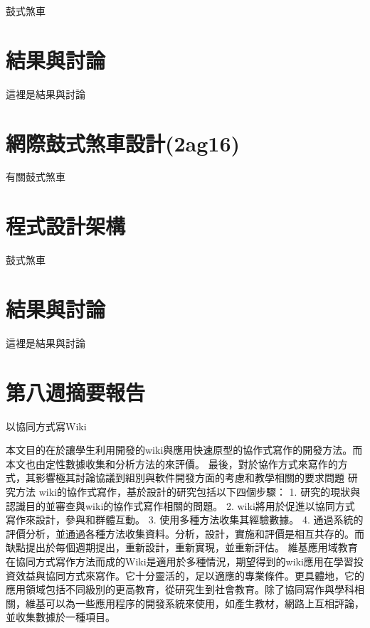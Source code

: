 \documentclass[]{article}
\begin{document}
鼓式煞車

\section{結果與討論}\label{ux7d50ux679cux8207ux8a0eux8ad6-3}

這裡是結果與討論

\section{網際鼓式煞車設計(2ag16)}\label{ux7db2ux969bux9f13ux5f0fux715eux8ecaux8a2dux8a082ag16}

有關鼓式煞車

\section{程式設計架構}\label{ux7a0bux5f0fux8a2dux8a08ux67b6ux69cb-4}

鼓式煞車

\section{結果與討論}\label{ux7d50ux679cux8207ux8a0eux8ad6-4}

這裡是結果與討論

\section{第八週摘要報告}\label{ux7b2cux516bux9031ux6458ux8981ux5831ux544a}

以協同方式寫Wiki

本文目的在於讓學生利用開發的wiki與應用快速原型的協作式寫作的開發方法。而本文也由定性數據收集和分析方法的來評價。
最後，對於協作方式來寫作的方式，其影響極其討論協議到組別與軟件開發方面的考慮和教學相關的要求問題
研究方法 wiki的協作式寫作，基於設計的研究包括以下四個步驟： 1.
研究的現狀與認識目的並審查與wiki的協作式寫作相關的問題。 2.
wiki將用於促進以協同方式寫作來設計，參與和群體互動。 3.
使用多種方法收集其經驗數據。 4.
通過系統的評價分析，並通過各種方法收集資料。分析，設計，實施和評價是相互共存的。而缺點提出於每個週期提出，重新設計，重新實現，並重新評估。
維基應用域教育在協同方式寫作方法而成的Wiki是適用於多種情況，期望得到的wiki應用在學習投資效益與協同方式來寫作。它十分靈活的，足以適應的專業條件。更具體地，它的應用領域包括不同級別的更高教育，從研究生到社會教育。除了協同寫作與學科相關，維基可以為一些應用程序的開發系統來使用，如產生教材，網路上互相評論，並收集數據於一種項目。
\end{document}
